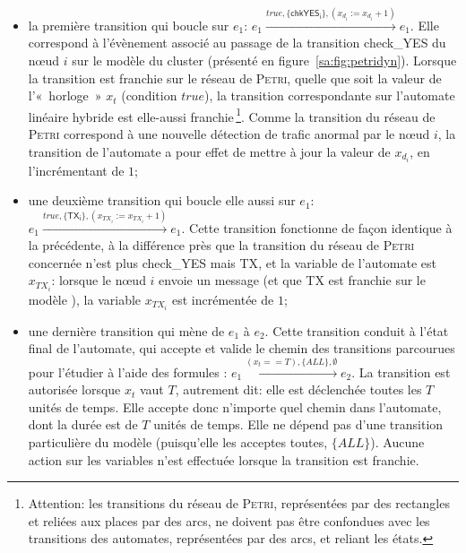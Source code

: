 \begin{itemize}
    \item la première transition qui boucle sur $e_1$: $e_1\xrightarrow{\mathit{true},\{\mathsf{chkYES_i}\},(x_{d_i}:=x_{d_i}+1)}{e_1}$.
        Elle correspond à l'évènement associé au passage de la transition \textsf{check\_YES} du nœud $i$ sur le modèle \rpsge du cluster (présenté en figure~\ref{sa:fig:petridyn}).
        Lorsque la transition est franchie sur le réseau de \textsc{Petri}, quelle que soit la valeur de l'«~horloge~» $x_t$ (condition $\mathit{true}$), la transition correspondante sur l'automate linéaire hybride est elle-aussi franchie\,\footnote{Attention: les transitions du réseau de \textsc{Petri}, représentées par des rectangles et reliées aux places par des arcs, ne doivent pas être confondues avec les transitions des automates, représentées par des arcs, et reliant les états.}.
        Comme la transition du réseau de \textsc{Petri} correspond à une nouvelle détection de trafic anormal par le nœud $i$, la transition de l'automate a pour effet de mettre à jour la valeur de $x_{d_i}$, en l'incrémentant de $1$;
    \item une deuxième transition qui boucle elle aussi sur $e_1$: $e_1\xrightarrow{\mathit{true},\{\mathsf{TX_i}\},(x_{\mathit{TX}_i}:=x_{\mathit{TX}_i}+1)}{e_1}$.
        Cette transition fonctionne de façon identique à la précédente, à la différence près que la transition du réseau de \textsc{Petri} concernée n'est plus \textsf{check\_YES} mais \textsf{TX}, et la variable de l'automate est $x_{\mathit{TX}_i}$: lorsque le nœud $i$ envoie un message (et que \textsf{TX} est franchie sur le modèle \rpsge), la variable $x_{\mathit{TX}_i}$ est incrémentée de $1$;
    \item une dernière transition qui mène de $e_1$ à $e_2$.
        Cette transition conduit à l'état final de l'automate, qui accepte et valide le chemin des transitions parcourues pour l'étudier à l'aide des formules \lsah: $e_1\xrightarrow{(x_t==T),\{\mathit{ALL}\},\emptyset}{e_2}$.
        La transition est autorisée lorsque $x_t$ vaut $T$, autrement dit: elle est déclenchée toutes les $T$ unités de temps.
        Elle accepte donc n'importe quel chemin dans l'automate, dont la durée est de $T$ unités de temps.
        Elle ne dépend pas d'une transition particulière du modèle \rpsge (puisqu'elle les acceptes toutes, $\{\mathit{ALL}\}$).
        Aucune action sur les variables n'est effectuée lorsque la transition est franchie.
\end{itemize}

